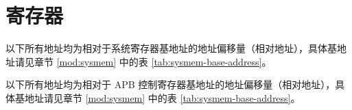 \documentclass[main\_\_CN.tex]{subfiles}
\begin{document}

\clearpage
\section{寄存器}

以下所有地址均为相对于系统寄存器基地址的地址偏移量（相对地址），具体基地址请见章节 \ref{mod:sysmem} \textit{} 中的表 \ref{tab:sysmem-base-address}。



以下所有地址均为相对于 APB 控制寄存器基地址的地址偏移量（相对地址），具体基地址请见章节 \ref{mod:sysmem} \textit{} 中的表 \ref{tab:sysmem-base-address}。


\end{document}
